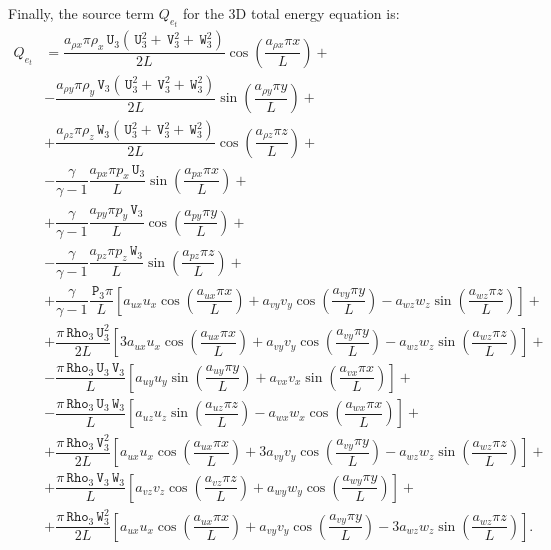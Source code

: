 \documentclass[10pt]{article}
\newcommand{\Rho}{\,\mathtt{Rho}}
\newcommand{\PP}{\,\mathtt{P}}
\newcommand{\U}{\,\mathtt{U}}
\newcommand{\V}{\,\mathtt{V}}
\newcommand{\W}{\,\mathtt{W}}
\begin{document}
Finally, the source term $Q_{e_t}$ for the 3D total energy equation is:
\begin{equation}
 \begin{split}\label{eq:euler_3d_e}
Q_{e_t} &= \dfrac{a_{\rho x} \pi \rho_x \U_3 (\U_3^2+\V_3^2+\W_3^2)}{2L}\cos\left(\dfrac{a_{\rho x} \pi x}{L}\right)+\\
&- \dfrac{a_{\rho y} \pi \rho_y \V_3 (\U_3^2+\V_3^2+\W_3^2)}{2L}\sin\left(\dfrac{a_{\rho y} \pi y}{L}\right)+\\
&+  \dfrac{a_{\rho z} \pi \rho_z \W_3 (\U_3^2+\V_3^2+\W_3^2)}{2L}\cos\left(\dfrac{a_{\rho z} \pi z}{L}\right)+\\
&-\dfrac{\gamma}{\gamma-1}\dfrac{a_{px} \pi p_x  \U_3}{L}\sin\left(\dfrac{a_{px} \pi x}{L}\right) +\\
&+\dfrac{\gamma}{\gamma-1}\dfrac{a_{py} \pi p_y \V_3}{L}\cos\left(\dfrac{a_{py} \pi y}{L}\right) +\\
&-\dfrac{\gamma}{\gamma-1}\dfrac{a_{pz}\pi  p_z  \W_3}{L}\sin\left(\dfrac{a_{pz} \pi z}{L}\right) +\\
&+ \dfrac{\gamma}{\gamma-1}\dfrac{\PP_3 \pi}{L}\left[a_{ux} u_x \cos\left(\dfrac{a_{ux} \pi x}{L}\right)+a_{vy} v_y \cos\left(\dfrac{a_{vy} \pi y}{L}\right)-a_{wz} w_z \sin\left(\dfrac{a_{wz} \pi z}{L}\right)\right] +\\
&+\dfrac{\pi \Rho_3 \U_3^2}{2L}\left[3 a_{ux} u_x \cos\left(\dfrac{a_{ux} \pi x}{L}\right)+a_{vy} v_y \cos\left(\dfrac{a_{vy} \pi y}{L}\right)-a_{wz} w_z \sin\left(\dfrac{a_{wz} \pi z}{L}\right)\right]+\\
&-\dfrac{\pi \Rho_3 \U_3 \V_3}{L}\left[a_{uy} u_y \sin\left(\dfrac{a_{uy} \pi y}{L}\right)+a_{vx} v_x \sin\left(\dfrac{a_{vx} \pi x}{L}\right)\right] +\\
&-\dfrac{\pi \Rho_3 \U_3 \W_3}{L}\left[a_{uz} u_z \sin\left(\dfrac{a_{uz} \pi z}{L}\right)-a_{wx} w_x \cos\left(\dfrac{a_{wx} \pi x}{L}\right)\right] +\\
&+\dfrac{\pi \Rho_3 \V_3^2}{2L}\left[a_{ux} u_x \cos\left(\dfrac{a_{ux} \pi x}{L}\right)+3 a_{vy} v_y \cos\left(\dfrac{a_{vy} \pi y}{L}\right)-a_{wz} w_z \sin\left(\dfrac{a_{wz} \pi z}{L}\right)\right] +\\
&+ \dfrac{\pi \Rho_3 \V_3 \W_3}{L}\left[a_{vz} v_z \cos\left(\dfrac{a_{vz} \pi z}{L}\right)+a_{wy} w_y \cos\left(\dfrac{a_{wy} \pi y}{L}\right)\right]+\\
&+\dfrac{\pi \Rho_3 \W_3^2}{2L}\left[a_{ux} u_x \cos\left(\dfrac{a_{ux} \pi x}{L}\right)+a_{vy} v_y \cos\left(\dfrac{a_{vy} \pi y}{L}\right)-3 a_{wz} w_z \sin\left(\dfrac{a_{wz} \pi z}{L}\right)\right] .
 \end{split}
\end{equation}
\end{document}
